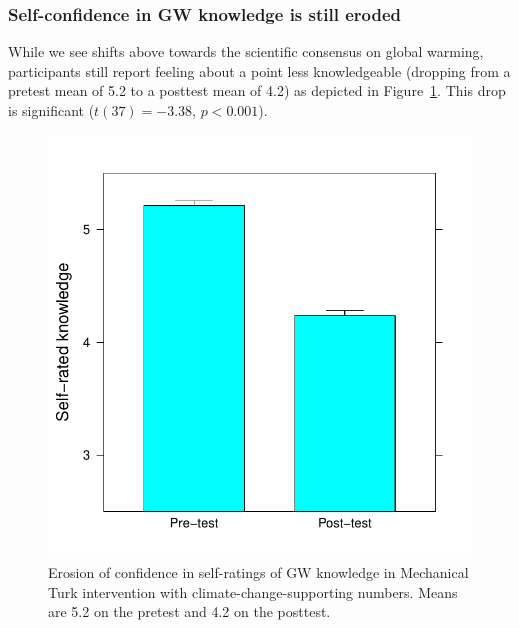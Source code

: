 \subsubsection{Self-confidence in GW knowledge is still eroded}

While we see shifts above towards the scientific consensus on global warming,
participants still report feeling about a point less knowledgeable (dropping
from a pretest mean of 5.2 to a posttest mean of 4.2) as depicted in
Figure~\ref{fig:prondi-knw}. This drop is significant ($t(37)=-3.38$, $p<0.001$).

\begin{figure}
    \centering
    \includegraphics{CCO-prondi-knw.pdf}
    \caption{Erosion of confidence in self-ratings of GW knowledge in Mechanical
        Turk intervention with climate-change-supporting numbers. Means are 5.2
    on the pretest and 4.2 on the posttest.}
    \label{fig:prondi-knw}
\end{figure}

% 

